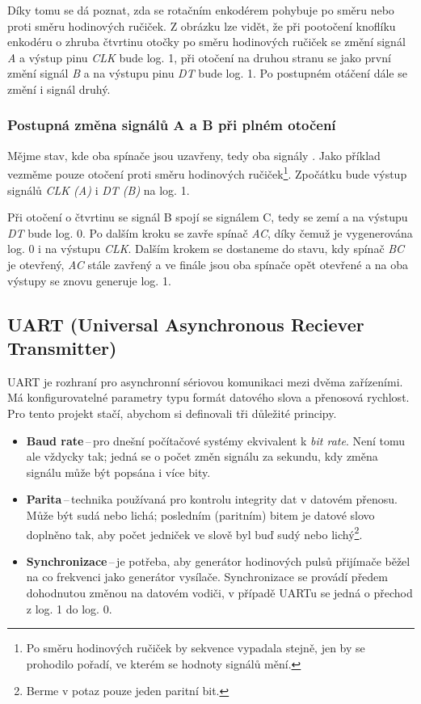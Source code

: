 \documentclass[a4paper, 11pt]{article}
\begin{document}
Díky tomu se dá poznat, zda se rotačním enkodérem pohybuje po směru nebo proti směru hodinových ručiček.
Z obrázku lze vidět, že při pootočení knoflíku enkodéru o zhruba čtvrtinu otočky po směru hodinových ručiček se změní signál \emph{A} a výstup pinu \emph{CLK} bude log. 1, při otočení na druhou stranu se jako první změní signál \emph{B} a na výstupu pinu \emph{DT} bude log. 1. Po postupném otáčení dále se změní i signál druhý.

\subsubsection{Postupná změna signálů A a B při plném otočení}\label{1_1_2:otoceni}

Mějme stav, kde oba spínače jsou uzavřeny, tedy oba signály . Jako příklad vezměme pouze otočení proti směru hodinových ručiček\footnote{Po směru hodinových ručiček by sekvence vypadala stejně, jen by se prohodilo pořadí, ve kterém se hodnoty signálů mění.}.
Zpočátku bude výstup signálů \emph{CLK (A)} i \emph{DT (B)} na log. 1.

Při otočení o čtvrtinu se signál B spojí se signálem C, tedy se zemí a na výstupu \emph{DT} bude log. 0.
Po dalším kroku se zavře spínač \emph{AC}, díky čemuž je vygenerována log. 0 i na výstupu \emph{CLK}.
Dalším krokem se dostaneme do stavu, kdy spínač \emph{BC} je otevřený, \emph{AC} stále zavřený a ve finále jsou oba spínače opět otevřené a na oba výstupy se znovu generuje log. 1.

\subsection{UART (Universal Asynchronous Reciever Transmitter)}\label{1_2:uart}

UART je rozhraní pro asynchronní sériovou komunikaci mezi dvěma zařízeními.
Má konfigurovatelné parametry typu formát datového slova a přenosová rychlost.
Pro tento projekt stačí, abychom si definovali tři důležité principy.
\begin{itemize}
    \item \textbf{Baud rate}\,--\,pro dnešní počítačové systémy ekvivalent k \emph{bit rate}. Není tomu ale vždycky tak; jedná se o počet změn signálu za sekundu, kdy změna signálu může být popsána i více bity. 
    \item \textbf{Parita}\,--\,technika používaná pro kontrolu integrity dat v datovém přenosu. Může být sudá nebo lichá; posledním (paritním) bitem je datové slovo doplněno tak, aby počet jedniček ve slově byl buď sudý nebo lichý\footnote{Berme v potaz pouze jeden paritní bit.}.
    \item \textbf{Synchronizace}\,--\,je potřeba, aby generátor hodinových pulsů přijímače běžel na co  frekvenci jako generátor vysílače. Synchronizace se provádí předem dohodnutou změnou na datovém vodiči, v případě UARTu se jedná o přechod z log. 1 do log. 0.
\end{itemize}
\end{document}
